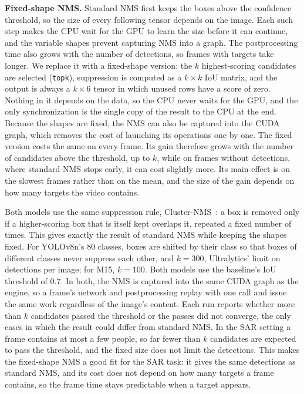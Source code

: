 \textbf{Fixed-shape NMS.} Standard NMS first keeps the boxes above the
confidence threshold, so the size of every following tensor depends on the
image. Each such step makes the CPU wait for the GPU to learn the size before
it can continue, and the variable shapes prevent capturing NMS into a graph.
The postprocessing time also grows with the number of detections, so frames
with targets take longer. We replace it with a fixed-shape version: the
$k$ highest-scoring candidates are selected (\texttt{topk}),
suppression is computed as a $k \times k$ IoU matrix, and the output is
always a $k \times 6$ tensor in which unused rows have a score of zero.
Nothing in it depends on the data, so the CPU never waits for the GPU, and
the only synchronization is the single copy of the result to the CPU at the
end. Because the shapes are fixed, the NMS can also be captured into the CUDA
graph, which removes the cost of launching its operations one by one. The fixed version costs the same on every frame.
Its gain therefore grows with the number of candidates above the threshold,
up to $k$, while on frames without detections, where standard NMS stops
early, it can cost slightly more. Its main effect is on the slowest frames
rather than on the mean, and the size of the gain depends on how many
targets the video contains.

Both models use the same suppression rule, Cluster-NMS~\cite{zheng2020clusternms}:
a box is removed only if a higher-scoring box that is itself kept overlaps it,
repeated a fixed number of times. This gives exactly the result of standard
NMS while keeping the shapes fixed. For YOLOv8n's 80 classes, boxes are
shifted by their class so that boxes of different classes never suppress each
other, and $k = 300$, Ultralytics' limit on detections per image; for M15,
$k = 100$. Both models use the baseline's IoU threshold of 0.7. In both, the
NMS is captured into the same CUDA graph as the engine, so a frame's network
and postprocessing replay with one call and issue the same work regardless of
the image's content. Each run reports whether more than $k$ candidates passed
the threshold or the passes did not converge, the only cases in which the
result could differ from standard NMS. In the SAR setting a frame contains at
most a few people, so far fewer than $k$ candidates are expected to pass the
threshold, and the fixed size does not limit the detections. This makes the
fixed-shape NMS a good fit for the SAR task: it gives the same detections as
standard NMS, and its cost does not depend on how many targets a frame
contains, so the frame time stays predictable when a target appears.

